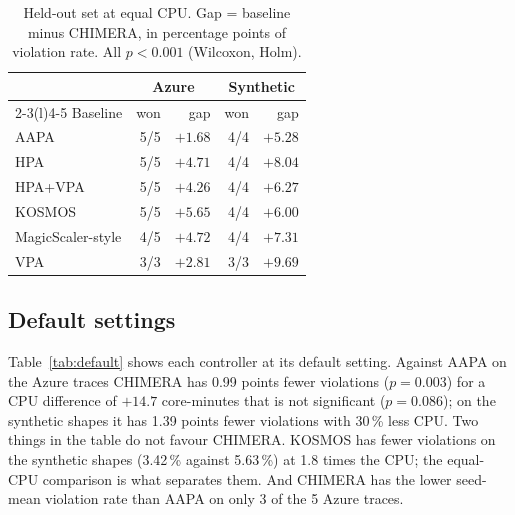 \documentclass[conference]{IEEEtran}
\begin{document}
\begin{table}[t]
\caption{Held-out set at equal CPU. Gap = baseline minus CHIMERA, in percentage points of
violation rate. All $p<0.001$ (Wilcoxon, Holm).}
\label{tab:heldout}
\centering
\begin{tabular}{@{}lrrrr@{}}
\toprule
 & \multicolumn{2}{c}{Azure} & \multicolumn{2}{c}{Synthetic} \\
\cmidrule(lr){2-3}\cmidrule(l){4-5}
Baseline & won & gap & won & gap \\
\midrule
AAPA & 5/5 & $+1.68$ & 4/4 & $+5.28$ \\
HPA & 5/5 & $+4.71$ & 4/4 & $+8.04$ \\
HPA+VPA & 5/5 & $+4.26$ & 4/4 & $+6.27$ \\
KOSMOS & 5/5 & $+5.65$ & 4/4 & $+6.00$ \\
MagicScaler-style & 4/5 & $+4.72$ & 4/4 & $+7.31$ \\
VPA & 3/3 & $+2.81$ & 3/3 & $+9.69$ \\
\bottomrule
\end{tabular}
\end{table}

\subsection{Default settings}

Table~\ref{tab:default} shows each controller at its default setting. Against AAPA on the
Azure traces CHIMERA has 0.99 points fewer violations ($p=0.003$) for a CPU difference of
$+14.7$ core-minutes that is not significant ($p=0.086$); on the synthetic shapes it has
1.39 points fewer violations with 30\,\% less CPU. Two things in the table do not favour
CHIMERA. KOSMOS has fewer violations on the synthetic shapes (3.42\,\% against 5.63\,\%) at
1.8 times the CPU; the equal-CPU comparison is what separates them. And CHIMERA has the
lower seed-mean violation rate than AAPA on only 3 of the 5 Azure traces.
\end{document}
